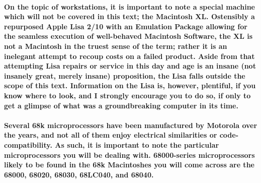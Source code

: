 \paragraph{%
On the topic of workstations, it is important to note a special machine which %
will not be covered in this text; the Macintosh XL. Ostensibly a repurposed %
Apple Lisa 2/10 with an Emulation Package allowing for the seamless execution %
of well-behaved Macintosh Software, the XL is not a Macintosh in the truest %
sense of the term; rather it is an inelegant attempt to recoup costs on a %
failed product. Aside from that attempting Lisa repairs or service in this %
day and age is an insane (not insanely great, merely insane) proposition, the %
Lisa falls outside the scope of this text. Information on the Lisa is, however, %
plentiful, if you know where to look, and I strongly encourage you to do so, if %
only to get a glimpse of what was a groundbreaking computer in its time. %
}

\paragraph{%
Several 68k microprocessors have been manufactured by Motorola over the years, %
and not all of them enjoy electrical similarities or code-compatibility. As such, %
it is important to note the particular microprocessors you will be dealing with. %
68000-series microprocessors likely to be found in the 68k Macintoshes you will %
come across are the 68000, 68020, 68030, 68LC040, and 68040. %
}






